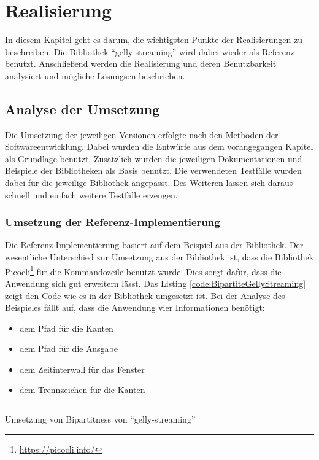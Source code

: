 \chapter{Realisierung}
In diesem Kapitel geht es darum, die wichtigsten Punkte der Realisierungen
zu beschreiben. Die Bibliothek \enquote{gelly-streaming} wird dabei wieder als
Referenz benutzt. Anschließend werden die Realisierung und deren Benutzbarkeit
analysiert und mögliche Lösungsen beschrieben.

\section{Analyse der Umsetzung}
Die Umsetzung der jeweiligen Versionen erfolgte nach den Methoden der
Softwareentwicklung. Dabei wurden die Entwürfe aus dem vorangegangen Kapitel
als Grundlage benutzt. Zusätzlich wurden die jeweiligen Dokumentationen und
Beispiele der Bibliotheken als Basis benutzt. Die verwendeten Testfälle wurden
dabei für die jeweilige Bibliothek angepasst. Des Weiteren lassen sich daraus
schnell und einfach weitere Testfälle erzeugen.

\subsection{Umsetzung der Referenz-Implementierung}
Die Referenz-Implementierung basiert auf dem Beispiel aus der Bibliothek. Der
wesentliche Unterschied zur Umsetzung aus der Bibliothek ist, dass die
Bibliothek Picocli\footnote{\url{https://picocli.info/}} für die Kommandozeile
benutzt wurde. Dies sorgt dafür, dass die Anwendung sich gut erweitern lässt.
Das Listing \ref{code:BipartiteGellyStreaming} zeigt den Code wie es in der
Bibliothek umgesetzt ist. Bei der Analyse des Beispieles fällt auf, dass die
Anwendung vier Informationen benötigt:

\begin{itemize}
\item dem Pfad für die Kanten
\item dem Pfad für die Ausgabe
\item dem Zeitinterwall für das Fenster
\item dem Trennzeichen für die Kanten
\end{itemize} 

\begin{listing}
\inputminted[breaklines=true]{java}{../material/code/BipartitenessCheckExample.java}
\caption{Umsetzung von Bipartitness von \enquote{gelly-streaming} \cite{Kalavri2018}}
\label{code:BipartiteGellyStreaming}
\end{listing}

